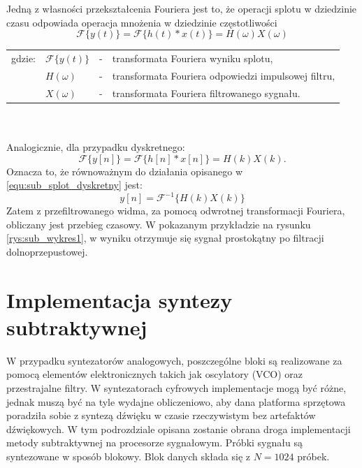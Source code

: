 Jedną z własności przekształcenia Fouriera jest to, że operacji splotu w dziedzinie czasu odpowiada operacja mnożenia w dziedzinie częstotliwości
\begin{equation} \label{equ:sub_splot_twierdzenie}
\mathcal{F}\{y(t)\} = \mathcal{F}\{h(t)*x(t)\} = H(\omega) X(\omega)
\end{equation}
\begin{tabular}{ l l l l}
	gdzie: & $\mathcal{F}\{y(t)\}$ &  - & transformata Fouriera wyniku splotu, \\
	&	$ H(\omega)$ & - &  transformata Fouriera odpowiedzi impulsowej filtru,\\
	&	$X(\omega)$ & - &  transformata Fouriera filtrowanego sygnału.\\
	
\end{tabular} \\ \\
Analogicznie, dla przypadku dyskretnego:
\begin{equation} \label{equ:sub_splot_twierdzenie_dyskretne}
\mathcal{F}\{y[n]\} = \mathcal{F}\{h[n]*x[n]\} = H(k) X(k).
\end{equation}
Oznacza to, że równoważnym do działania opisanego w \ref{equ:sub_splot_dyskretny} jest:
\begin{equation} \label{equ:sub_splot_dyskretny2}
y[n] = \mathcal{F}^{-1}\{ H(k) X(k)\} 
\end{equation}
Zatem z przefiltrowanego widma, za pomocą odwrotnej transformacji Fouriera, obliczany jest przebieg czasowy. W pokazanym przykładzie na rysunku \ref{rys:sub_wykres1}, w wyniku otrzymuje się sygnał prostokątny po filtracji dolnoprzepustowej.
\section{Implementacja syntezy subtraktywnej}
W przypadku syntezatorów analogowych, poszczególne bloki są realizowane za pomocą elementów elektronicznych takich jak oscylatory (VCO) oraz przestrajalne filtry. W syntezatorach cyfrowych implementacje mogą być różne, jednak muszą być na tyle wydajne obliczeniowo, aby dana platforma sprzętowa poradziła sobie z syntezą dźwięku w czasie rzeczywistym bez artefaktów dźwiękowych. W tym podrozdziale opisana zostanie obrana droga implementacji metody subtraktywnej na procesorze sygnałowym. 
Próbki sygnału są syntezowane w sposób blokowy. Blok danych składa się z $N=1024$ próbek.



